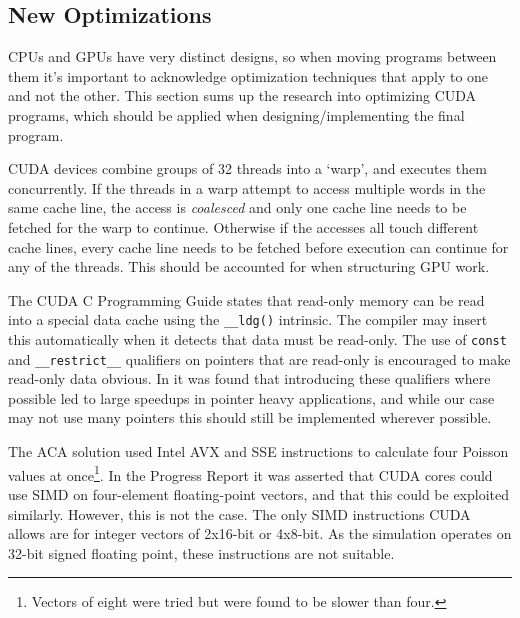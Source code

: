 \subsection{New Optimizations}
\label{sec:FutureOptimization}
CPUs and GPUs have very distinct designs, so when moving programs between them it's important to acknowledge optimization techniques that apply to one and not the other.
This section sums up the research into optimizing CUDA programs, which should be applied when designing/implementing the final program.

CUDA devices combine groups of 32 threads into a `warp', and executes them concurrently\cite{tool:CUDAProgrammingV1}.
If the threads in a warp attempt to access multiple words in the same cache line, the access is \textit{coalesced}\cite{NVIDIAHowBlog} and only one cache line needs to be fetched for the warp to continue.
Otherwise if the accesses all touch different cache lines, every cache line needs to be fetched before execution can continue for any of the threads.
This should be accounted for when structuring GPU work.

The CUDA C Programming Guide\cite{NVIDIAGlobalGuide} states that read-only memory can be read into a special data cache using the \texttt{\_\_ldg()} intrinsic.
The compiler may insert this automatically when it detects that data must be read-only.
The use of \texttt{const} and \texttt{\_\_restrict\_\_} qualifiers on pointers that are read-only is encouraged to make read-only data obvious.
In \cite{10.1145/3238147.3241533} it was found that introducing these qualifiers where possible led to large speedups in pointer heavy applications, and while our case may not use many pointers this should still be implemented wherever possible.

The ACA solution used Intel AVX and SSE instructions\cite{IntelCorporationIntroductionExtensions} to calculate four Poisson values at once\footnote{Vectors of eight were tried but were found to be slower than four.}.
In the Progress Report it was asserted that CUDA cores could use SIMD on four-element floating-point vectors, and that this could be exploited similarly.
However, this is not the case.
The only SIMD instructions CUDA allows are for integer vectors of 2x16-bit or 4x8-bit\cite{NvidiaCUDASIMD}.%
As the simulation operates on 32-bit signed floating point, these instructions are not suitable.

